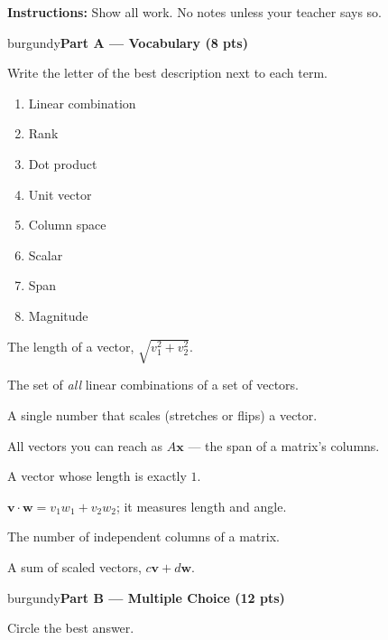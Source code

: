 \documentclass[10pt]{article}
\newcommand{\vv}{\mathbf{v}}
\newcommand{\ww}{\mathbf{w}}
\newcommand{\xx}{\mathbf{x}}
\newcommand{\parthead}[1]{%
  \vspace{6pt}\noindent
  \begin{headlinebox}{burgundy}{\color{white}\bfseries #1}\end{headlinebox}%
  \vspace{4pt}}
\begin{document}
\namedateperiod

\vspace{0.06in}
\noindent\textbf{Instructions:} Show all work. No notes unless your teacher says so.

\parthead{Part A --- Vocabulary (8 pts)}
Write the letter of the best description next to each term.

\vspace{4pt}
\noindent
\begin{minipage}[t]{0.44\textwidth}
\begin{enumerate}[leftmargin=2.2em, itemsep=7pt, label=\arabic*.]
  \item Linear combination 
  \item Rank 
  \item Dot product 
  \item Unit vector 
  \item Column space 
  \item Scalar 
  \item Span 
  \item Magnitude 
\end{enumerate}
\end{minipage}%
\hfill
\begin{minipage}[t]{0.53\textwidth}
\small
\begin{description}[leftmargin=1.4em, itemsep=3pt]
  \item[(A)] The length of a vector, $\sqrt{v_1^2+v_2^2}$.
  \item[(B)] The set of \emph{all} linear combinations of a set of vectors.
  \item[(C)] A single number that scales (stretches or flips) a vector.
  \item[(D)] All vectors you can reach as $A\xx$ --- the span of a matrix's columns.
  \item[(E)] A vector whose length is exactly $1$.
  \item[(F)] $\vv\cdot\ww=v_1w_1+v_2w_2$; it measures length and angle.
  \item[(G)] The number of independent columns of a matrix.
  \item[(H)] A sum of scaled vectors, $c\vv+d\ww$.
\end{description}
\end{minipage}

\parthead{Part B --- Multiple Choice (12 pts)}
Circle the best answer.
\end{document}
